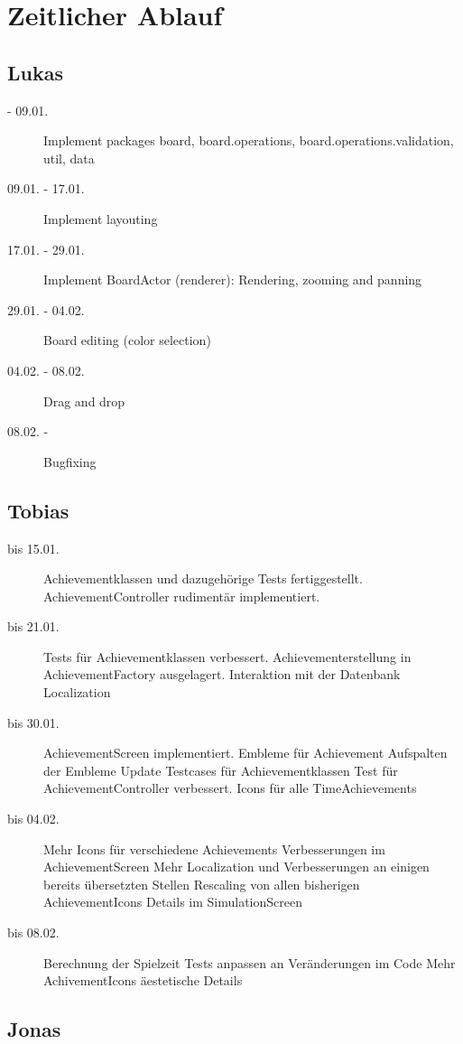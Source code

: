 \chapter{Zeitlicher Ablauf}

\section{Lukas}
\begin{description}
\item[ - 09.01.]
Implement packages board, board.operations, board.operations.validation, util, data
\item[09.01. - 17.01.]
Implement layouting
\item[17.01. - 29.01.]
Implement BoardActor (renderer): Rendering, zooming and panning
\item[29.01. - 04.02.]
Board editing (color selection)
\item[04.02. - 08.02.]
Drag and drop
\item[08.02. - ]
Bugfixing
\end{description}

\section{Tobias}
\begin{description}
\item[bis 15.01.]
Achievementklassen und dazugehörige Tests fertiggestellt.
AchievementController rudimentär implementiert.
\item[bis 21.01.]
Tests für Achievementklassen verbessert.
Achievementerstellung in AchievementFactory ausgelagert.
Interaktion mit der Datenbank
Localization
\item[bis 30.01.]
AchievementScreen implementiert.
Embleme für Achievement
Aufspalten der Embleme
Update Testcases für Achievementklassen
Test für AchievementController verbessert.
Icons für alle TimeAchievements
\item[bis 04.02.]
Mehr Icons für verschiedene Achievements
Verbesserungen im AchievementScreen
Mehr Localization und Verbesserungen an einigen bereits übersetzten Stellen
Rescaling von allen bisherigen AchievementIcons
Details im SimulationScreen
\item[bis 08.02.]
Berechnung der Spielzeit
Tests anpassen an Veränderungen im Code
Mehr AchivementIcons
äestetische Details
\end{description}

\section{Jonas}

